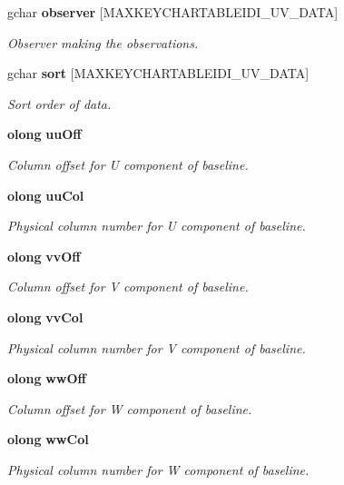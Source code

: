 \begin{CompactItemize}
gchar {\bf observer} [MAXKEYCHARTABLEIDI\_\-UV\_\-DATA]
\begin{CompactList}\small\item\em Observer making the observations. \item\end{CompactList}\item 
gchar {\bf sort} [MAXKEYCHARTABLEIDI\_\-UV\_\-DATA]
\begin{CompactList}\small\item\em Sort order of data. \item\end{CompactList}\item 
{\bf olong} {\bf uu\-Off}
\begin{CompactList}\small\item\em Column offset for U component of baseline. \item\end{CompactList}\item 
{\bf olong} {\bf uu\-Col}
\begin{CompactList}\small\item\em Physical column number for U component of baseline. \item\end{CompactList}\item 
{\bf olong} {\bf vv\-Off}
\begin{CompactList}\small\item\em Column offset for V component of baseline. \item\end{CompactList}\item 
{\bf olong} {\bf vv\-Col}
\begin{CompactList}\small\item\em Physical column number for V component of baseline. \item\end{CompactList}\item 
{\bf olong} {\bf ww\-Off}
\begin{CompactList}\small\item\em Column offset for W component of baseline. \item\end{CompactList}\item 
{\bf olong} {\bf ww\-Col}
\begin{CompactList}\small\item\em Physical column number for W component of baseline. \item\end{CompactList}\item 

\end{CompactItemize}

